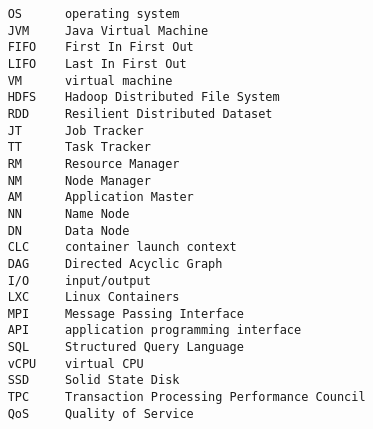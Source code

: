     \begin{acronym}[EMODPS]
    \end{acronym}
\begin{verbatim}
	OS 		operating system
	JVM 	Java Virtual Machine
	FIFO 	First In First Out
	LIFO 	Last In First Out
	VM 		virtual machine
	HDFS 	Hadoop Distributed File System
	RDD 	Resilient Distributed Dataset
	JT 		Job Tracker
	TT 		Task Tracker
	RM 		Resource Manager
	NM 		Node Manager
	AM 		Application Master
	NN 		Name Node
	DN 		Data Node
	CLC 	container launch context
	DAG 	Directed Acyclic Graph
	I/O 	input/output
	LXC 	Linux Containers
	MPI 	Message Passing Interface
	API 	application programming interface
	SQL 	Structured Query Language
	vCPU 	virtual CPU
	SSD 	Solid State Disk
	TPC 	Transaction Processing Performance Council
	QoS 	Quality of Service
\end{verbatim}